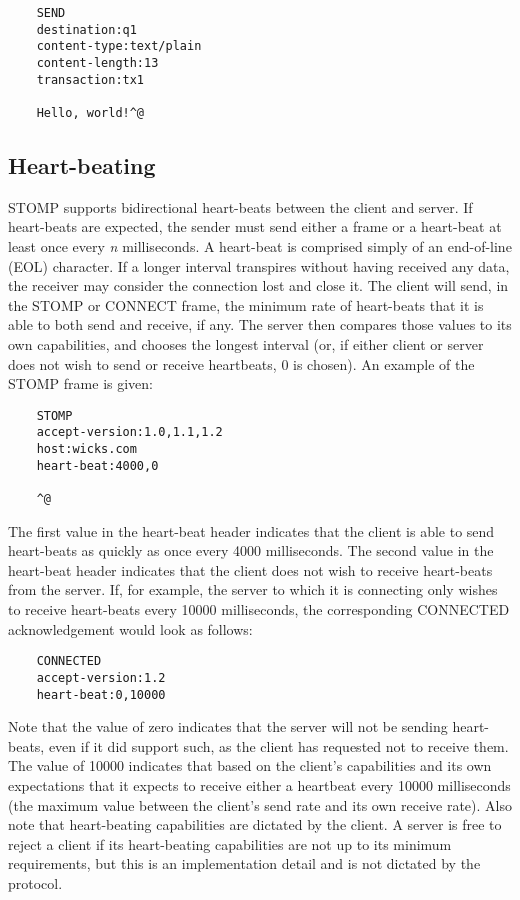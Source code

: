 \documentclass[conference, letterpaper]{IEEEtran}
\begin{document}
\begin{verbatim}
    SEND
    destination:q1
    content-type:text/plain
    content-length:13
    transaction:tx1

    Hello, world!^@
\end{verbatim}

\subsection{Heart-beating}
STOMP supports bidirectional heart-beats between the client and server. If heart-beats are expected, the sender must send either a frame or a heart-beat at least once every \textit{n} milliseconds. A heart-beat is comprised simply of an end-of-line (EOL) character. If a longer interval transpires without having received any data, the receiver may consider the connection lost and close it. The client will send, in the STOMP or CONNECT frame, the minimum rate of heart-beats that it is able to both send and receive, if any. The server then compares those values to its own capabilities, and chooses the longest interval (or, if either client or server does not wish to send or receive heartbeats, 0 is chosen). An example of the STOMP frame is given:

\begin{verbatim}
    STOMP
    accept-version:1.0,1.1,1.2
    host:wicks.com
    heart-beat:4000,0
    
    ^@
\end{verbatim}

The first value in the heart-beat header indicates that the client is able to send heart-beats as quickly as once every 4000 milliseconds.  The second value in the heart-beat header indicates that the client does not wish to receive heart-beats from the server. If, for example, the server to which it is connecting only wishes to receive heart-beats every 10000 milliseconds, the corresponding CONNECTED acknowledgement would look as follows:

\begin{verbatim}
    CONNECTED
    accept-version:1.2
    heart-beat:0,10000
\end{verbatim}

Note that the value of zero indicates that the server will not be sending heart-beats, even if it did support such, as the client has requested not to receive them. The value of 10000 indicates that based on the client's capabilities and its own expectations that it expects to receive either a heartbeat every 10000 milliseconds (the maximum value between the client's send rate and its own receive rate). Also note that heart-beating capabilities are dictated by the client. A server is free to reject a client if its heart-beating capabilities are not up to its minimum requirements, but this is an implementation detail and is not dictated by the protocol.
\end{document}
